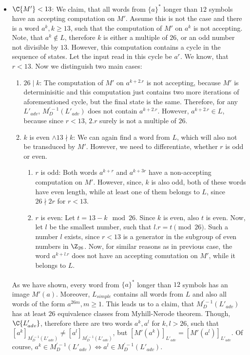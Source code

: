 \begin{itemize}
\item $\C{M'} < 13$: We claim, that all words from $\{a\}^*$ longer than $12$ symbols have an accepting computation on $M'$. Assume this is not the case and there is a word $a^k, k \geq 13$, such that the computation of $M'$ on $a^k$ is not accepting. Note, that $a^k \notin L$, therefore $k$ is either a multiple of $26$, or an odd number not divisible by $13$. However, this computation contains a cycle in the sequence of states. Let the input read in this cycle be $a^r$. We know, that $r < 13$. Now we distinguish two main cases:

\begin{enumerate}
\item $26 \mid k$: The computation of $M'$ on $a^{k+2.r}$ is not accepting, because $M'$ is determinisitic and this computation just contains two more iterations of aforementioned cycle, but the final state is the same. Therefore, for any $L'_{adv}$, $M^{'-1}_{D}(L'_{adv})$ does not contain $a^{k+2.r}$. However, $a^{k+2.r} \in L$, because since $r < 13$, $2.r$ surely is not a multiple of $26$. 

\item $k$ is even $\wedge 13 \nmid k$: We can again find a word from $L$, which will also not be transduced by $M'$. However, we need to differentiate, whether $r$ is odd or even.

\begin{enumerate}
\item $r$ is odd: Both words $a^{k+r}$ and $a^{k+3r}$ have a non-accepting computation on $M'$. However, since, $k$ is also odd, both of these words have even length, while at least one of them belongs to $L$, since $26 \nmid 2r$ for $r < 13$.

\item $r$ is even: Let $t = 13 - k \mod 26$. Since $k$ is even, also $t$ is even. Now, let $l$ be the smallest number, such that $l.r = t \pmod{26}$. Such a number $l$ exists, since $r < 13$ is a generator in the subgroup of even numbers in $\Z_{26}$. Now, for similar reasons as in previous case, the word $a^{k+l.r}$ does not have an accepting comutation on $M'$, while it belongs to $L$.
\end{enumerate}
\end{enumerate}

\paragraph{}
As we have shown, every word from $\{a\}^*$ longer than $12$ symbols has an image $M'(a)$. Moreover, $L_{simple}$ contains all words from $L$ and also all words of the form $a^{26m}, m \geq 1$. This leads us to a claim, that $M_D^{'-1}(L'_{adv})$ has at least $26$ equivalence classes from Myhill-Nerode theorem. Though, $\C{L'_{adv}}$, therefore there are two words $a^k, a^l$ for $k,l > 26$, such that $[a^k]_{M_D^{'-1}(L'_{adv})} \neq [a^l]_{M_D^{'-1}(L'_{adv})}$, but $[M'(a^k)]_{L'_{adv}} = [M'(a^l)]_{L'_{adv}}$. Of course, $a^k \in M_D^{'-1}(L'_{adv}) \Leftrightarrow  a^l \in M_D^{'-1}(L'_{adv})$.


\end{itemize}
